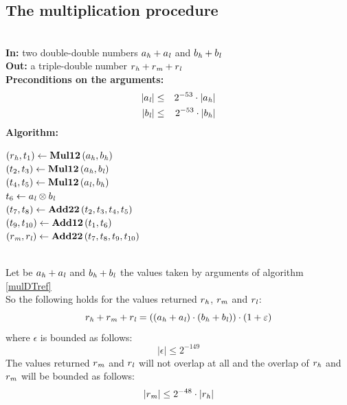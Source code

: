 \subsection{The multiplication procedure \MulDT}
\begin{algorithm}[\MulDT] \label{mulDTref} ~ \\
{\bf In:} two double-double numbers $a_{\mathit{h}} + a_{\mathit{l}}$ and $b_{\mathit{h}} + b_{\mathit{l}}$ \\
{\bf Out:} a triple-double number $r_{\mathit{h}} + r_{\mathit{m}} + r_{\mathit{l}}$ \\
{\bf Preconditions on the arguments:}
\begin{eqnarray*}
\left \vert a_{\mathit{l}} \right \vert & \leq & 2^{-53} \cdot \left \vert a_{\mathit{h}} \right \vert \\
\left \vert b_{\mathit{l}} \right \vert & \leq & 2^{-53} \cdot \left \vert b_{\mathit{h}} \right \vert \\
\end{eqnarray*}
{\bf Algorithm:} \\
\begin{center}
\begin{minipage}[b]{50mm}
$\left( r_{\mathit{h}}, t_1 \right) \gets \mathbf{Mul12}\left( a_{\mathit{h}}, b_{\mathit{h}} \right)$ \\
$\left( t_2, t_3 \right) \gets \mathbf{Mul12}\left( a_{\mathit{h}}, b_{\mathit{l}} \right)$ \\
$\left( t_4, t_5 \right) \gets \mathbf{Mul12}\left( a_{\mathit{l}}, b_{\mathit{h}} \right)$ \\
$t_6 \gets a_{\mathit{l}} \otimes b_{\mathit{l}}$ \\
$\left( t_7, t_8 \right) \gets \mathbf{Add22}\left( t_2, t_3, t_4, t_5 \right)$ \\
$\left( t_9, t_{10} \right) \gets \mathbf{Add12}\left( t_1, t_6 \right)$ \\
$\left( r_{\mathit{m}}, r_{\mathit{l}} \right) \gets \mathbf{Add22}\left( t_7, t_8, t_9, t_{10} \right)$ \\
\end{minipage}
\end{center}
\end{algorithm}
\begin{theorem} ~ \\
Let be $a_{\mathit{h}} + a_{\mathit{l}}$ and $b_{\mathit{h}} + b_{\mathit{l}}$ the values taken by arguments of algorithm \ref{mulDTref} \MulDT \\
So the following holds for the values returned $r_{\mathit{h}}$, $r_{\mathit{m}}$ and $r_{\mathit{l}}$:
$$r_{\mathit{h}} + r_{\mathit{m}} + r_{\mathit{l}} = \left(\left(a_{\mathit{h}} + a_{\mathit{l}} \right) \cdot \left( b_{\mathit{h}} + b_{\mathit{l}} \right)\right) \cdot \left(1 + \varepsilon\right)$$
where $\epsilon$ is bounded as follows:
$$\left \vert \epsilon \right \vert \leq 2^{-149}$$
The values returned $r_{\mathit{m}}$ and $r_{\mathit{l}}$ will not overlap at all and the overlap of $r_{\mathit{h}}$ and $r_{\mathit{m}}$ will be bounded as
follows:
$$\left \vert r_{\mathit{m}} \right \vert \leq 2^{-48} \cdot \left \vert r_{\mathit{h}} \right \vert$$
\end{theorem}

